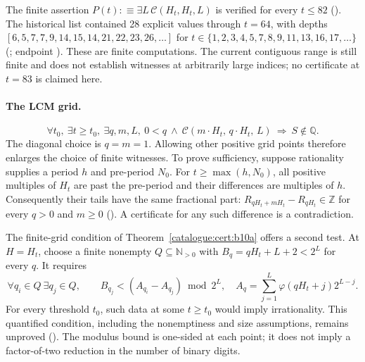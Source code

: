 The finite assertion $P(t):\equiv\exists L\,\mathcal C(H_t,H_t,L)$
is verified for every $t\le82$
().
The historical list contained 28 explicit values through $t=64$, with
depths $[6,5,7,7,9,14,15,14,21,22,23,26,\dots]$ for
$t\in\{1,2,3,4,5,7,8,9,11,13,16,17,\dots\}$
(;
endpoint
).
These are finite computations. The current contiguous
range is still finite and does not establish witnesses at arbitrarily
large indices; no certificate at $t=83$ is claimed here.

\paragraph{The LCM grid.}
\[
  \forall t_0,\ \exists t\ge t_0,\ \exists q,m,L,\ 0<q\ \wedge\
    \mathcal{C}(m\cdot H_t,\, q\cdot H_t,\, L)
  \ \Longrightarrow\ S\notin\mathbb Q.
\]
The diagonal choice is $q=m=1$. Allowing other positive grid points
therefore enlarges the choice of finite witnesses. To prove
sufficiency, suppose rationality supplies a period $h$ and pre-period
$N_0$. For $t\ge\max(h,N_0)$, all positive multiples of $H_t$ are
past the pre-period and their differences are multiples of $h$.
Consequently their tails have the same fractional part:
$R_{qH_t+mH_t}-R_{qH_t}\in\mathbb Z$ for every $q>0$ and $m\ge0$
(). A certificate for any such difference is a contradiction.

The finite-grid condition of Theorem~\ref{catalogue:cert:b10a} offers
a second test. At $H=H_t$, choose a finite nonempty
$Q\subseteq\mathbb N_{>0}$ with $B_q=qH_t+L+2<2^L$ for every $q$.
It requires
\[
 \forall q_i\in Q\ \exists q_j\in Q,\qquad
 B_{q_j}<(A_{q_i}-A_{q_j})\bmod2^L,
 \quad A_q=\sum_{j=1}^{L}\varphi(qH_t+j)2^{L-j}.
\]
For every threshold $t_0$, such data at some $t\ge t_0$ would imply
irrationality. This quantified condition, including the nonemptiness
and size assumptions, remains unproved
(). The modulus bound is one-sided at each point; it does not imply
a factor-of-two reduction in the number of binary digits.

